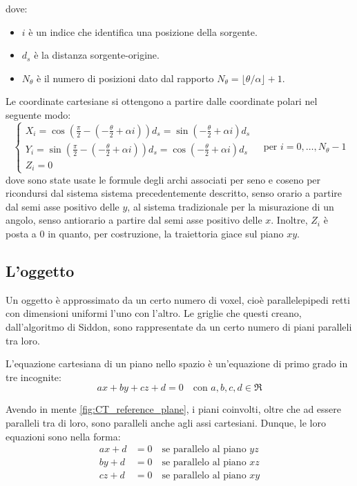 \documentclass[12pt,a4paper]{report}
\begin{document}
dove:
\begin{itemize}
  \item \(i\) è un indice che identifica una posizione della sorgente.
  \item \(d_s\) è la distanza sorgente-origine.
  \item \(N_\theta\) è il numero di posizioni dato dal rapporto \(N_\theta = \lfloor \theta/\alpha \rfloor + 1\).
\end{itemize}

Le coordinate cartesiane si ottengono a partire dalle coordinate polari nel seguente modo:
\begin{equation} \label{eq:gonometric_source_coordinates}
  \begin{cases}
    X_i = \cos(\frac{\pi}{2} - (-\frac{\theta}{2} + \alpha i)) d_s = \sin(-\frac{\theta}{2} + \alpha i) d_s \\
    Y_i = \sin(\frac{\pi}{2} - (-\frac{\theta}{2} + \alpha i)) d_s = \cos(-\frac{\theta}{2} + \alpha i) d_s \\
    Z_i = 0
  \end{cases} \quad \text{per } i = 0, \dots, N_\theta - 1
\end{equation}
dove sono state usate le formule degli archi associati per seno e coseno per ricondursi dal sistema sistema precedentemente
descritto, senso orario a partire dal semi asse positivo delle \(y\), al sistema tradizionale per la misurazione di un angolo,
senso antiorario a partire dal semi asse positivo delle \(x\).
Inoltre, \(Z_i\) è posta a \(0\) in quanto, per costruzione, la traiettoria giace sul piano \(xy\).

\subsection{L'oggetto}

Un oggetto è approssimato da un certo numero di voxel, cioè parallelepipedi retti con dimensioni uniformi l'uno con l'altro.
Le griglie che questi creano, dall'algoritmo di Siddon, sono rappresentate da un certo numero di piani paralleli tra loro.

L'equazione cartesiana di un piano nello spazio è un'equazione di primo grado in tre incognite:
\begin{equation*}
  ax + by + cz + d = 0 \quad \text{con } a, b, c, d \in \Re
\end{equation*}

Avendo in mente \autoref{fig:CT_reference_plane}, i piani coinvolti, oltre che ad essere paralleli tra di loro, sono paralleli
anche agli assi cartesiani.
Dunque, le loro equazioni sono nella forma:
\begin{align*}
  ax + d &= 0 \quad \text{se parallelo al piano } yz \\
  by + d &= 0 \quad \text{se parallelo al piano } xz \\
  cz + d &= 0 \quad \text{se parallelo al piano } xy
\end{align*}
\end{document}
